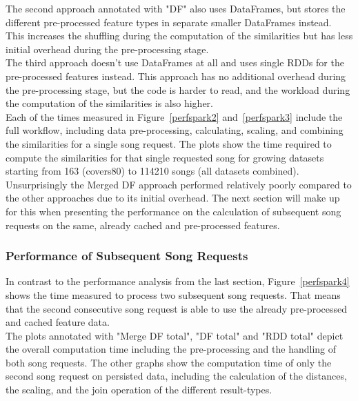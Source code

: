 \noindent The second approach annotated with "DF" also uses DataFrames, but stores the different pre-processed feature types in separate smaller DataFrames instead. This increases the shuffling during the computation of the similarities but has less initial overhead during the pre-processing stage.\\
The third approach doesn't use DataFrames at all and uses single RDDs for the pre-processed features instead. This approach has no additional overhead during the pre-processing stage, but the code is harder to read, and the workload during the computation of the similarities is also higher.\\
Each of the times measured in Figure~\ref{perfspark2} and~\ref{perfspark3} include the full workflow, including data pre-processing, calculating, scaling, and combining the similarities for a single song request. The plots show the time required to compute the similarities for that single requested song for growing datasets starting from 163 (covers80) to 114210 songs (all datasets combined). 
\noindent Unsurprisingly the Merged DF approach performed relatively poorly compared to the other approaches due to its initial overhead. The next section will make up for this when presenting the performance on the calculation of subsequent song requests on the same, already cached and pre-processed features.

\subsubsection{Performance of Subsequent Song Requests}

In contrast to the performance analysis from the last section, Figure~\ref{perfspark4} shows the time measured to process two subsequent song requests. That means that the second consecutive song request is able to use the already pre-processed and cached feature data.\\ %
\noindent The plots annotated with "Merge DF total", "DF total" and "RDD total" depict the overall computation time including the pre-processing and the handling of both song requests. The other graphs show the computation time of only the second song request on persisted data, including the calculation of the distances, the scaling, and the join operation of the different result-types.

